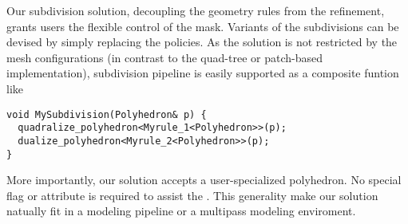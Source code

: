 Our subdivision solution, decoupling the geometry rules from the
refinement, grants users the flexible control of the mask.
Variants of the subdivisions can be devised by simply replacing
the policies. As the solution is not restricted by the 
mesh configurations (in contrast to the quad-tree or patch-based 
implementation), subdivision pipeline is easily supported
as a composite funtion like
\begin{lstlisting}
void MySubdivision(Polyhedron& p) {
  quadralize_polyhedron<Myrule_1<Polyhedron>>(p);
  dualize_polyhedron<Myrule_2<Polyhedron>>(p);
} 
\end{lstlisting}

More importantly, our solution accepts a user-specialized 
polyhedron. No special flag or attribute is required 
to assist the \tr . This generality make our solution natually fit 
in a modeling pipeline or a multipass modeling enviroment. 


 
